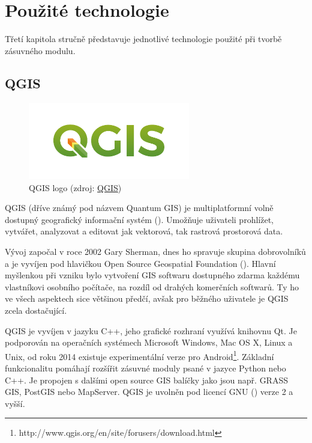 \chapter{Použité technologie}
\label{3-technologie}

Třetí kapitola stručně představuje jednotlivé technologie použité při tvorbě zásuvného modulu.

\section{QGIS}

\begin{figure}[H]
    \centering
      \includegraphics[width=200pt]{./pictures/qgis-logo.png}
      \caption[QGIS logo]{QGIS logo 
      (zdroj: \href{https://www.qgis.org/en/_downloads/qgis-logo.png}{QGIS})}
      \label{fig:qgis}
  \end{figure}

QGIS (dříve známý pod názvem Quantum GIS) je multiplatformní volně dostupný geografický informační systém (). Umožňuje uživateli prohlížet, vytvářet, analyzovat a editovat jak vektorová, tak rastrová prostorová data.

Vývoj započal v roce 2002 Gary Sherman, dnes ho spravuje skupina dobrovolníků a je vyvíjen pod hlavičkou Open Source Geospatial Foundation (). Hlavní myšlenkou při vzniku bylo vytvoření GIS softwaru dostupného zdarma každému vlastníkovi osobního počítače, na rozdíl od drahých komerčních softwarů. Ty ho ve všech aspektech sice většinou předčí, avšak pro běžného uživatele je QGIS zcela dostačující.

QGIS je vyvíjen v jazyku C++, jeho grafické rozhraní využívá knihovnu Qt. Je podporován na operačních systémech Microsoft Windows, Mac OS X, Linux a Unix, od roku 2014 existuje experimentální verze pro Android\footnote{http://www.qgis.org/en/site/forusers/download.html}. Základní funkcionalitu pomáhají rozšířit zásuvné moduly psané v jazyce Python nebo C++. Je propojen s dalšími open source GIS balíčky jako jsou např. GRASS GIS, PostGIS nebo MapServer. QGIS je uvolněn pod licencí GNU () verze 2 a vyšší.

